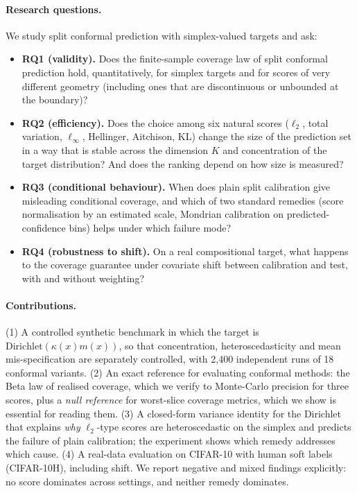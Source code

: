 \paragraph{Research questions.} We study split conformal prediction with simplex-valued targets and ask:
\begin{itemize}[leftmargin=1.2em,itemsep=0pt,topsep=2pt]
\item \textbf{RQ1 (validity).} Does the finite-sample coverage law of split conformal prediction hold, quantitatively, for simplex targets and for scores of very different geometry (including ones that are discontinuous or unbounded at the boundary)?
\item \textbf{RQ2 (efficiency).} Does the choice among six natural scores ($\ell_2$, total variation, $\ell_\infty$, Hellinger, Aitchison, KL) change the size of the prediction set in a way that is stable across the dimension $K$ and concentration of the target distribution? And does the ranking depend on how size is measured?
\item \textbf{RQ3 (conditional behaviour).} When does plain split calibration give misleading conditional coverage, and which of two standard remedies (score normalisation by an estimated scale, Mondrian calibration on predicted-confidence bins) helps under which failure mode?
\item \textbf{RQ4 (robustness to shift).} On a real compositional target, what happens to the coverage guarantee under covariate shift between calibration and test, with and without weighting?
\end{itemize}
\paragraph{Contributions.} (1) A controlled synthetic benchmark in which the target is $\mathrm{Dirichlet}(\kappa(x)m(x))$, so that concentration, heteroscedasticity and mean mis-specification are separately controlled, with 2,400 independent runs of 18 conformal variants. (2) An exact reference for evaluating conformal methods: the Beta law of realised coverage, which we verify to Monte-Carlo precision for three scores, plus a \emph{null reference} for worst-slice coverage metrics, which we show is essential for reading them. (3) A closed-form variance identity for the Dirichlet that explains \emph{why} $\ell_2$-type scores are heteroscedastic on the simplex and predicts the failure of plain calibration; the experiment shows which remedy addresses which cause. (4) A real-data evaluation on CIFAR-10 with human soft labels (CIFAR-10H), including shift. We report negative and mixed findings explicitly: no score dominates across settings, and neither remedy dominates.

